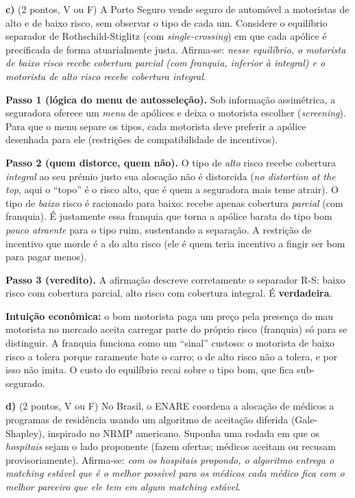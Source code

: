 \textbf{c)} (2 pontos, V ou F) A Porto Seguro vende seguro de autom\'ovel a motoristas de alto e de baixo risco, sem observar o tipo de cada um. Considere o equil\'ibrio separador de Rothschild-Stiglitz (com \emph{single-crossing}) em que cada ap\'olice \'e precificada de forma atuarialmente justa. Afirma-se: \emph{nesse equil\'ibrio, o motorista de baixo risco recebe cobertura parcial (com franquia, inferior \`a integral) e o motorista de alto risco recebe cobertura integral}.

\begin{solucao}
\textbf{Passo 1 (l\'ogica do menu de autossele\c{c}\~ao).} Sob informa\c{c}\~ao assim\'etrica, a seguradora oferece um \emph{menu} de ap\'olices e deixa o motorista escolher (\emph{screening}). Para que o menu separe os tipos, cada motorista deve preferir a ap\'olice desenhada para ele (restri\c{c}\~oes de compatibilidade de incentivos).

\textbf{Passo 2 (quem distorce, quem n\~ao).} O tipo de \emph{alto} risco recebe cobertura \emph{integral} ao seu pr\'emio justo \textemdash{} sua aloca\c{c}\~ao n\~ao \'e distorcida (\emph{no distortion at the top}, aqui o ``topo'' \'e o risco alto, que \'e quem a seguradora mais teme atrair). O tipo de \emph{baixo} risco \'e racionado para baixo: recebe apenas cobertura \emph{parcial} (com franquia). \'E justamente essa franquia que torna a ap\'olice barata do tipo bom \emph{pouco atraente} para o tipo ruim, sustentando a separa\c{c}\~ao. A restri\c{c}\~ao de incentivo que morde \'e a do alto risco (ele \'e quem teria incentivo a fingir ser bom para pagar menos).

\textbf{Passo 3 (veredito).} A afirma\c{c}\~ao descreve corretamente o separador R-S: baixo risco com cobertura parcial, alto risco com cobertura integral. \'E \textbf{verdadeira}.

\textbf{Intui\c{c}\~ao econ\^omica:} o bom motorista paga um pre\c{c}o pela presen\c{c}a do mau motorista no mercado \textemdash{} aceita carregar parte do pr\'oprio risco (franquia) s\'o para se distinguir. A franquia funciona como um ``sinal'' custoso: o motorista de baixo risco a tolera porque raramente bate o carro; o de alto risco n\~ao a tolera, e por isso n\~ao imita. O custo do equil\'ibrio recai sobre o tipo bom, que fica sub-segurado.
\end{solucao}

\textbf{d)} (2 pontos, V ou F) No Brasil, o ENARE coordena a aloca\c{c}\~ao de m\'edicos a programas de resid\^encia usando um algoritmo de aceita\c{c}\~ao diferida (Gale-Shapley), inspirado no NRMP americano. Suponha uma rodada em que os \emph{hospitais} sejam o lado proponente (fazem ofertas; m\'edicos aceitam ou recusam provisoriamente). Afirma-se: \emph{com os hospitais propondo, o algoritmo entrega o matching est\'avel que \'e o melhor poss\'ivel para os m\'edicos \textemdash{} cada m\'edico fica com o melhor parceiro que ele tem em algum matching est\'avel}.

